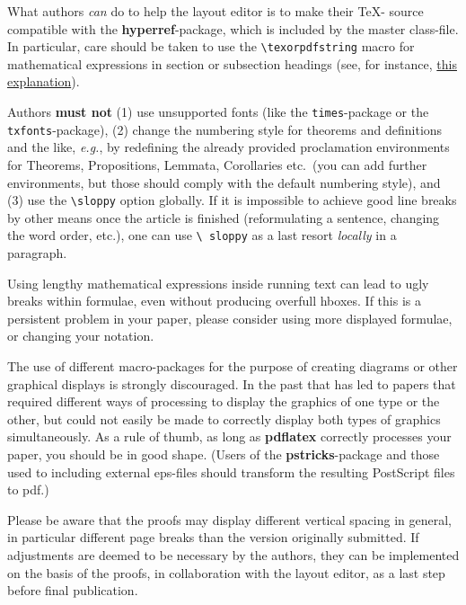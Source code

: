 \documentclass{jpc} %
\theoremstyle{plain}\newtheorem{satz}[thm]{Satz} %
\def\eg{{\em e.g.}}
\begin{document}
  What authors \emph{can} do to help the layout editor is to make
  their \TeX- source compatible with the {\bf hyperref}-package, which
  is included by the master class-file.  In particular, care should be
  taken to use the \texttt{\textbackslash texorpdfstring} macro for
  mathematical expressions in section or subsection headings (see, for
  instance, \href{http://www.fauskes.net/nb/latextips/#hyperref}{this
    explanation}).  

  Authors \textbf{must not} (1) use unsupported fonts (like the
  \texttt{times}-package or the \texttt{txfonts}-package), (2) change
  the numbering style for theorems and definitions and the like, \eg,
  by redefining the already provided proclamation environments for
  Theorems, Propositions, Lemmata, Corollaries etc.\ (you can add
  further environments, but those should comply with the default
  numbering style), and (3) use the \texttt{\textbackslash sloppy}
  option globally.  If it is impossible to achieve good line breaks by
  other means once the article is finished (reformulating a sentence,
  changing the word order, etc.), one can use \texttt{\textbackslash
    sloppy} as a last resort \emph{locally} in a paragraph.

  Using lengthy mathematical expressions inside running text can lead
  to ugly breaks within formulae, even without producing overfull
  hboxes.  If this is a persistent problem in your paper, please
  consider using more displayed formulae, or changing your notation.

  The use of different macro-packages for the purpose of creating
  diagrams or other graphical displays is strongly discouraged.  In
  the past that has led to papers that required different ways of
  processing to display the graphics of one type or the other, but
  could not easily be made to correctly display both types of graphics
  simultaneously.  As a rule of thumb, as long as {\bf pdflatex}
  correctly processes your paper, you should be in good shape. (Users
  of the {\bf pstricks}-package and those used to including external
  eps-files should transform the resulting PostScript files to pdf.)

  Please be aware that the proofs may display different vertical
  spacing in general, in particular different page breaks than the
  version originally submitted.  If adjustments are deemed to be
  necessary by the authors, they can be implemented on the basis of
  the proofs, in collaboration with the layout editor, as a last step
  before final publication.
 
\end{document}
